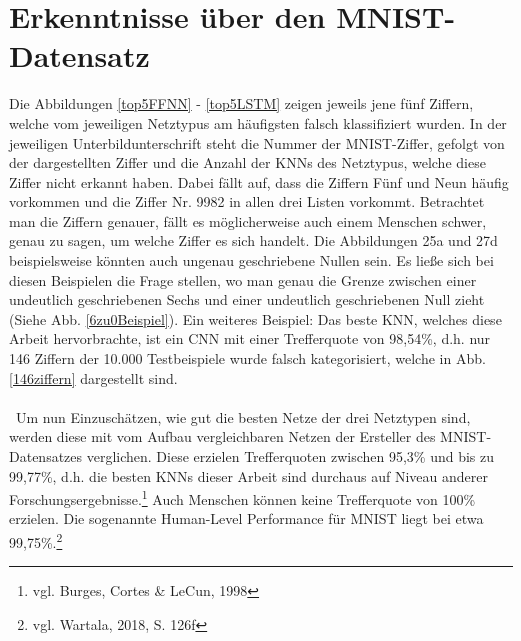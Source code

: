 \documentclass[
	a4paper,
	12pt,
	ngerman,
	oneside
]{scrreprt}											%
\begin{document}
		\section{Erkenntnisse über den MNIST-Datensatz}
			Die Abbildungen \ref{top5FFNN} - \ref{top5LSTM} zeigen jeweils jene fünf Ziffern, welche vom jeweiligen Netztypus am häufigsten falsch klassifiziert wurden. In der jeweiligen Unterbildunterschrift steht die Nummer der MNIST-Ziffer, gefolgt von der dargestellten Ziffer und die Anzahl der KNNs des Netztypus, welche diese Ziffer nicht erkannt haben. Dabei fällt auf, dass die Ziffern Fünf und Neun häufig vorkommen und die Ziffer Nr. 9982 in allen drei Listen vorkommt. Betrachtet man die Ziffern genauer, fällt es möglicherweise auch einem Menschen schwer, genau zu sagen, um welche Ziffer es sich handelt. Die Abbildungen 25a und 27d beispielsweise könnten auch ungenau geschriebene Nullen sein. Es ließe sich bei diesen Beispielen die Frage stellen, wo man genau die Grenze zwischen einer undeutlich geschriebenen Sechs und einer undeutlich geschriebenen Null zieht (Siehe Abb. \ref{6zu0Beispiel}). Ein weiteres Beispiel: Das beste KNN, welches diese Arbeit hervorbrachte, ist ein CNN mit einer Trefferquote von 98,54\%, d.h. nur 146 Ziffern der 10.000 Testbeispiele wurde falsch kategorisiert, welche in Abb. \ref{146ziffern} dargestellt sind. 
			\\ \
			\\ \
			Um nun Einzuschätzen, wie gut die besten Netze der drei Netztypen sind, werden diese mit vom Aufbau vergleichbaren Netzen der Ersteller des MNIST-Datensatzes verglichen. Diese erzielen Trefferquoten zwischen 95,3\% und bis zu 99,77\%, d.h. die besten KNNs dieser Arbeit sind durchaus auf Niveau anderer Forschungsergebnisse.\footnote{vgl. Burges, Cortes \& LeCun, 1998} Auch Menschen können keine Trefferquote von 100\% erzielen. Die sogenannte Human-Level Performance für MNIST liegt bei etwa 99,75\%.\footnote{vgl. Wartala, 2018, S. 126f} 
			
\end{document}

